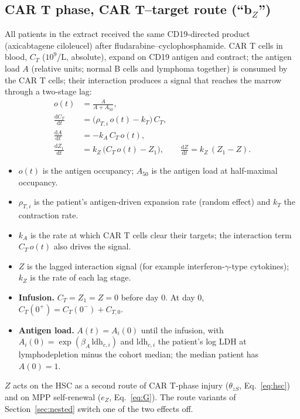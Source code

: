 \documentclass[11pt]{article}
\newcommand{\dd}{\mathrm{d}}
\begin{document}
\subsection{CAR T phase, CAR T--target route \texorpdfstring{(``b$_Z$'')}{(b-Z)}}\label{sec:cart}
All patients in the extract received the same CD19-directed product (axicabtagene ciloleucel) after fludarabine--cyclophosphamide. CAR T cells in blood, $C_T$ ($10^9$/L, absolute), expand on CD19 antigen and contract; the antigen load $A$ (relative units; normal B cells and lymphoma together) is consumed by the CAR T cells; their interaction produces a signal that reaches the marrow through a two-stage lag:
\begin{align}
o(t) &= \frac{A}{A + A_{50}}, \label{eq:occ}\\
\frac{\dd C_T}{\dd t} &= \bigl(\rho_{T,i}\, o(t) - k_T\bigr)\, C_T, \label{eq:cart}\\
\frac{\dd A}{\dd t} &= -k_A\, C_T\, o(t), \label{eq:antigen}\\
\frac{\dd Z_1}{\dd t} &= k_Z\,\bigl(C_T\,o(t) - Z_1\bigr), \qquad \frac{\dd Z}{\dd t} = k_Z\,(Z_1 - Z). \label{eq:zlag}
\end{align}
\begin{itemize}
\item $o(t)$ is the antigen occupancy; $A_{50}$ is the antigen load at half-maximal occupancy.
\item $\rho_{T,i}$ is the patient's antigen-driven expansion rate (random effect) and $k_T$ the contraction rate.
\item $k_A$ is the rate at which CAR T cells clear their targets; the interaction term $C_T\,o(t)$ also drives the signal.
\item $Z$ is the lagged interaction signal (for example interferon-$\gamma$-type cytokines); $k_Z$ is the rate of each lag stage.
\item \textbf{Infusion.} $C_T=Z_1=Z=0$ before day 0. At day 0, $C_T(0^+)=C_T(0^-)+C_{T,0}$.
\item \textbf{Antigen load.} $A(t)=A_i(0)$ until the infusion, with $A_i(0)=\exp(\beta_A\,\mathrm{ldh}_{c,i})$ and $\mathrm{ldh}_{c,i}$ the patient's log LDH at lymphodepletion minus the cohort median; the median patient has $A(0)=1$.
\end{itemize}
$Z$ acts on the HSC as a second route of CAR T-phase injury ($\theta_{zS}$, Eq.~\ref{eq:hsc}) and on MPP self-renewal ($e_Z$, Eq.~\ref{eq:G}). The route variants of Section~\ref{sec:nested} switch one of the two effects off.
\end{document}
